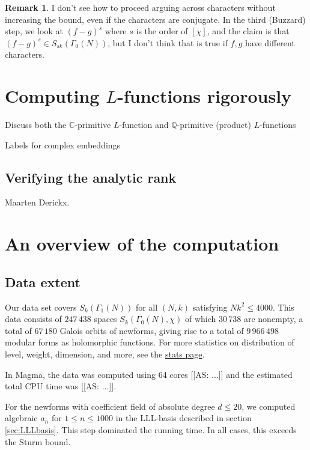\documentclass[11pt]{amsart}
\numberwithin{equation}{subsection}
\theoremstyle{plain}
\theoremstyle{definition}
\newtheorem{remark}[equation]{Remark}
\newcommand{\Q}{\mathbb{Q}}
\newcommand{\C}{\mathbb{C}}
\newcommand{\as}[1]{{\color{pastelred} \textsf{[[AS: #1]]}}}
\begin{document}
\begin{remark}
I don't see how to proceed arguing across characters without increasing the bound, even if the characters are conjugate.  In the third (Buzzard) step, we look at $(f-g)^s$ where $s$ is the order of $[\chi]$, and the claim is that $(f-g)^s \in S_{sk}(\Gamma_0(N))$, but I don't think that is true if $f,g$ have different characters.
\end{remark}

\section{Computing $L$-functions rigorously} \label{sec:Lfunctions}

Discuss both the $\C$-primitive $L$-function and $\Q$-primitive (product) $L$-functions

Labels for complex embeddings

\subsection{Verifying the analytic rank}

Maarten Derickx.

\section{An overview of the computation} \label{sec:overview}

\subsection{Data extent}

Our data set covers $S_k(\Gamma_1(N))$ for all $(N,k)$ satisfying $Nk^2 \leq 4000$.  This data consists of $247\,438$ spaces $S_k(\Gamma_0(N),\chi)$ of which $30\,738$ are nonempty, a total of $67\,180$ Galois orbits of newforms, giving rise to a total of $9\,966\,498$ modular forms as holomorphic functions.  For more statistics on distribution of level, weight, dimension, and more, see the \href{http://cmfs.lmfdb.xyz/ModularForm/GL2/Q/holomorphic/stats}{stats page}.

In Magma, the data was computed using 64 cores \as{...} and the estimated total CPU time was \as{...}.  

For the newforms with coefficient field of absolute degree $d \leq 20$, we computed algebraic $a_n$ for $1 \leq n \leq 1000$ in the LLL-basis described in section \ref{sec:LLLbasis}.  This step dominated the running time.  In all cases, this exceeds the Sturm bound.
\end{document}
